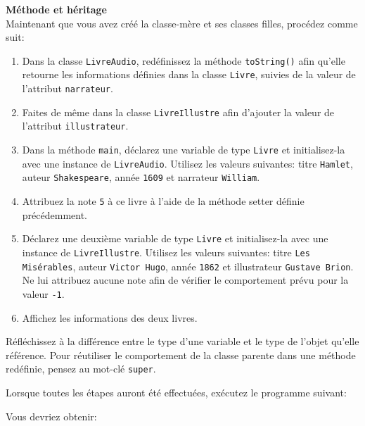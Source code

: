 \begin{Exercice}[10 minutes] \textbf{Méthode et héritage} \\
Maintenant que vous avez créé la classe-mère et ses classes filles, procédez comme suit:
\begin{enumerate}
    \item Dans la classe \lstinline{LivreAudio}, redéfinissez la méthode \lstinline{toString()} afin qu'elle retourne les informations définies dans la classe \lstinline{Livre}, suivies de la valeur de l'attribut \lstinline{narrateur}.
    \item Faites de même dans la classe \lstinline{LivreIllustre} afin d'ajouter la valeur de l'attribut \lstinline{illustrateur}.
    \item Dans la méthode \lstinline{main}, déclarez une variable de type \lstinline{Livre} et initialisez-la avec une instance de \lstinline{LivreAudio}. Utilisez les valeurs suivantes: titre \texttt{Hamlet}, auteur \texttt{Shakespeare}, année \lstinline{1609} et narrateur \texttt{William}.
    \item Attribuez la note \lstinline{5} à ce livre à l'aide de la méthode setter définie précédemment.
    \item Déclarez une deuxième variable de type \lstinline{Livre} et initialisez-la avec une instance de \lstinline{LivreIllustre}. Utilisez les valeurs suivantes: titre \texttt{Les Misérables}, auteur \texttt{Victor Hugo}, année \lstinline{1862} et illustrateur \texttt{Gustave Brion}. Ne lui attribuez aucune note afin de vérifier le comportement prévu pour la valeur \lstinline{-1}.
    \item Affichez les informations des deux livres.
\end{enumerate}
\begin{conseil}
Réfléchissez à la différence entre le type d'une variable et le type de l'objet qu'elle référence. Pour réutiliser le comportement de la classe parente dans une méthode redéfinie, pensez au mot-clé \lstinline{super}.
\end{conseil}
\begin{solution}
	
\end{solution}
\begin{solution}
	
\end{solution}
\begin{solution}
	
\end{solution}
\end{Exercice}

Lorsque toutes les étapes auront été effectuées, exécutez le programme suivant:

Vous devriez obtenir:

    

